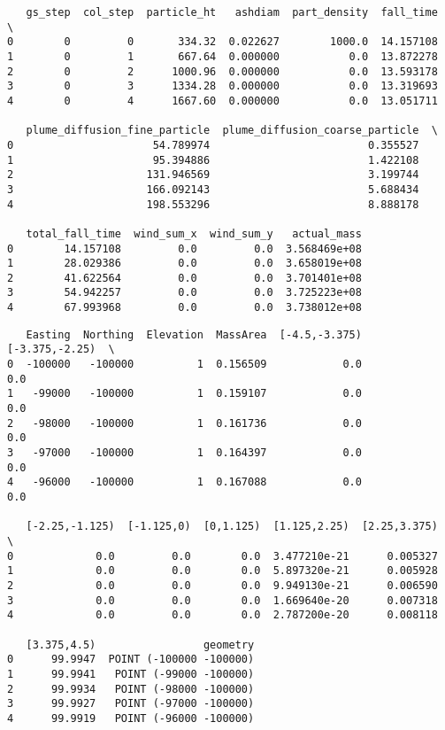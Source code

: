 \documentclass[11pt]{article}
\begin{document}
    
    \begin{verbatim}
   gs_step  col_step  particle_ht   ashdiam  part_density  fall_time  \
0        0         0       334.32  0.022627        1000.0  14.157108   
1        0         1       667.64  0.000000           0.0  13.872278   
2        0         2      1000.96  0.000000           0.0  13.593178   
3        0         3      1334.28  0.000000           0.0  13.319693   
4        0         4      1667.60  0.000000           0.0  13.051711   

   plume_diffusion_fine_particle  plume_diffusion_coarse_particle  \
0                      54.789974                         0.355527   
1                      95.394886                         1.422108   
2                     131.946569                         3.199744   
3                     166.092143                         5.688434   
4                     198.553296                         8.888178   

   total_fall_time  wind_sum_x  wind_sum_y   actual_mass  
0        14.157108         0.0         0.0  3.568469e+08  
1        28.029386         0.0         0.0  3.658019e+08  
2        41.622564         0.0         0.0  3.701401e+08  
3        54.942257         0.0         0.0  3.725223e+08  
4        67.993968         0.0         0.0  3.738012e+08  
    \end{verbatim}

    
    
    \begin{verbatim}
   Easting  Northing  Elevation  MassArea  [-4.5,-3.375)  [-3.375,-2.25)  \
0  -100000   -100000          1  0.156509            0.0             0.0   
1   -99000   -100000          1  0.159107            0.0             0.0   
2   -98000   -100000          1  0.161736            0.0             0.0   
3   -97000   -100000          1  0.164397            0.0             0.0   
4   -96000   -100000          1  0.167088            0.0             0.0   

   [-2.25,-1.125)  [-1.125,0)  [0,1.125)  [1.125,2.25)  [2.25,3.375)  \
0             0.0         0.0        0.0  3.477210e-21      0.005327   
1             0.0         0.0        0.0  5.897320e-21      0.005928   
2             0.0         0.0        0.0  9.949130e-21      0.006590   
3             0.0         0.0        0.0  1.669640e-20      0.007318   
4             0.0         0.0        0.0  2.787200e-20      0.008118   

   [3.375,4.5)                 geometry  
0      99.9947  POINT (-100000 -100000)  
1      99.9941   POINT (-99000 -100000)  
2      99.9934   POINT (-98000 -100000)  
3      99.9927   POINT (-97000 -100000)  
4      99.9919   POINT (-96000 -100000)  
    \end{verbatim}
\end{document}
